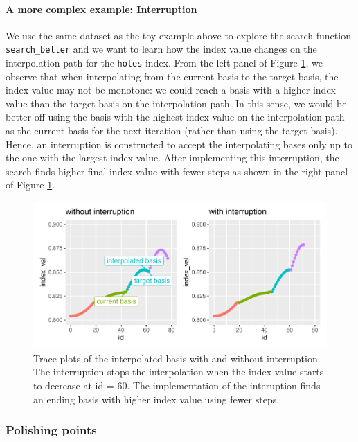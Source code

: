 \documentclass[12pt]{article}
\begin{document}
\hypertarget{a-more-complex-example-interruption}{%
\paragraph{A more complex example:
Interruption}\label{a-more-complex-example-interruption}}

We use the same dataset as the toy example above to explore the search
function \texttt{search\_better} and we want to learn how the index
value changes on the interpolation path for the \texttt{holes} index.
From the left panel of Figure \ref{interruption}, we observe that when
interpolating from the current basis to the target basis, the index
value may not be monotone: we could reach a basis with a higher index
value than the target basis on the interpolation path. In this sense, we
would be better off using the basis with the highest index value on the
interpolation path as the current basis for the next iteration (rather
than using the target basis). Hence, an interruption is constructed to
accept the interpolating bases only up to the one with the largest index
value. After implementing this interruption, the search finds higher
final index value with fewer steps as shown in the right panel of Figure
\ref{interruption}.

\begin{figure}
\centering
\includegraphics{paper_files/figure-latex/interruption-1.pdf}
\caption{\label{interruption}Trace plots of the interpolated basis with
and without interruption. The interruption stops the interpolation when
the index value starts to decrease at id = 60. The implementation of the
interuption finds an ending basis with higher index value using fewer
steps.}
\end{figure}

\hypertarget{polishing-points}{%
\subsubsection{Polishing points}\label{polishing-points}}
\end{document}
